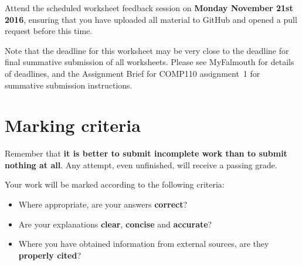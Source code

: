 \documentclass{../../fal_assignment}
\begin{document}
Attend the scheduled worksheet feedback session on \textbf{Monday November 21st 2016},
ensuring that you have uploaded all material to GitHub and opened a pull request before this time.

Note that the deadline for this worksheet may be very close to the deadline for final summative submission of all worksheets.
Please see MyFalmouth for details of deadlines, and the Assignment Brief for COMP110 assignment~1 for summative submission instructions.

\section*{Marking criteria}

Remember that \textbf{it is better to submit incomplete work than to submit nothing at all}.
Any attempt, even unfinished, will receive a passing grade.

Your work will be marked according to the following criteria:
\begin{itemize}
	\item Where appropriate, are your answers \textbf{correct}?
	\item Are your explanations \textbf{clear}, \textbf{concise} and \textbf{accurate}?
	\item Where you have obtained information from external sources, are they \textbf{properly cited}?
\end{itemize}
\end{document}
